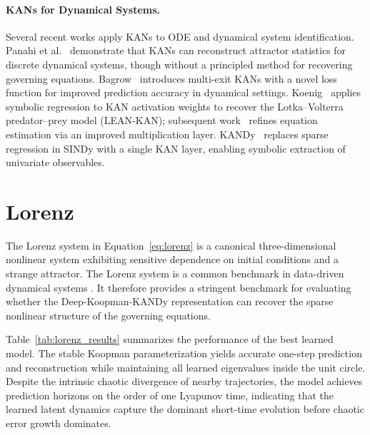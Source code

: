 \documentclass{article}
\begin{document}
\paragraph{KANs for Dynamical Systems.} Several recent works apply KANs to ODE and dynamical system identification. Panahi et al.~\cite{Panahi2025KANModelDiscovery} demonstrate that KANs can reconstruct attractor statistics for discrete dynamical systems, though without a principled method for recovering governing equations. Bagrow~\cite{Bagrow2025} introduces multi-exit KANs with a novel loss function for improved prediction accuracy in dynamical settings. Koenig~\cite{Koenig2024} applies symbolic regression to KAN activation weights to recover the Lotka--Volterra predator--prey model (LEAN-KAN); subsequent work~\cite{Koenig2025} refines equation estimation via an improved multiplication layer. KANDy~\cite{kandy} replaces sparse regression in SINDy with a single KAN layer, enabling symbolic extraction of univariate observables.


\section{Lorenz}
\label{app:lorenz_eigs}



The Lorenz system in Equation~\ref{eq:lorenz} is a canonical three-dimensional nonlinear system exhibiting sensitive dependence on initial conditions and a strange attractor. The Lorenz system is a common benchmark in data-driven dynamical systems \cite{sindy, kandy, sindy_ae}. It therefore provides a stringent benchmark for evaluating whether the Deep-Koopman-KANDy representation can recover the sparse nonlinear structure of the governing equations.

Table~\ref{tab:lorenz_results} summarizes the performance of the best learned model. The stable Koopman parameterization yields accurate one-step prediction and reconstruction while maintaining all learned eigenvalues inside the unit circle. Despite the intrinsic chaotic divergence of nearby trajectories, the model achieves prediction horizons on the order of one Lyapunov time, indicating that the learned latent dynamics capture the dominant short-time evolution before chaotic error growth dominates.
\end{document}
